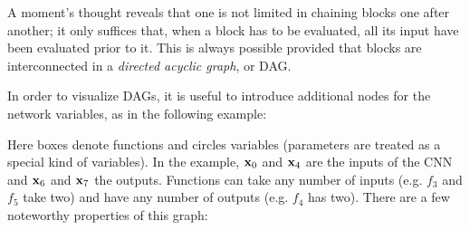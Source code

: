 A moment's thought reveals that one is not limited in chaining blocks one after another; it only suffices that, when a block has to be evaluated, all its input have been evaluated prior to it. This is always possible provided that blocks are interconnected in a \emph{directed acyclic graph}, or DAG.

In order to visualize DAGs, it is useful to introduce additional nodes for the network variables,  as in the following example:
\begin{center}
\end{center}
Here boxes denote functions and circles variables (parameters are treated as a special kind of variables). In the example, $\mathbf{x}_0$ and $\mathbf{x}_4$ are the inputs of the CNN and $\mathbf{x}_6$ and $\mathbf{x}_7$ the outputs. Functions can take any number of inputs (e.g. $f_3$ and $f_5$ take two) and have any number of outputs (e.g. $f_4$ has two). There are a few noteworthy properties of this graph:

